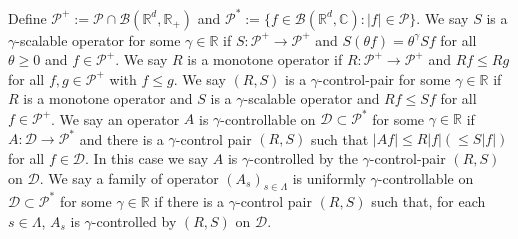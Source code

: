 \documentclass[12pt]{amsart}
\theoremstyle{plain}
\theoremstyle{definition}
\numberwithin{equation}{section}
\begin{document}
    Define $\mathcal P^+:= \mathcal P \cap \mathcal B(\mathbb R^d, \mathbb R_+)$ and $\mathcal P^*:= \{f\in \mathcal B(\mathbb R^d, \mathbb C): |f|\in \mathcal P\}$.
    We say $S$ is a $\gamma$-scalable operator for some $\gamma\in \mathbb R$ if $S: \mathcal P^+ \to \mathcal P^+$ and $S(\theta f) = \theta^\gamma Sf$ for all $\theta \geq 0$ and $f \in \mathcal P^+$.
    We say $R$ is a monotone operator if $R:\mathcal P^+ \to \mathcal P^+$ and $Rf \leq Rg$ for all $f, g \in \mathcal P^+$ with $f\leq g$.
    We say $(R,S)$ is a $\gamma$-control-pair for some $\gamma \in \mathbb R$ if $R$ is a monotone operator and $S$ is a $\gamma$-scalable operator and $Rf\leq Sf$ for all $f\in \mathcal P^+$.
    We say an operator $A$ is $\gamma$-controllable on $\mathcal D \subset \mathcal P^*$ for some $\gamma \in \mathbb R$ if $A: \mathcal D \to \mathcal P^*$ and there  is a $\gamma$-control pair $(R,S)$ such that $|Af|\leq R|f| (\le S|f|)$ for all $f\in \mathcal D$.
    In this case we say $A$ is $\gamma$-controlled by the $\gamma$-control-pair $(R,S)$ on $\mathcal D$.
    We say a family of operator $(A_s)_{s\in \Lambda}$ is uniformly $\gamma$-controllable on $\mathcal D\subset \mathcal P^*$ for some $\gamma \in \mathbb R$ if there is a $\gamma$-control pair $(R,S)$ such that, for each $s\in \Lambda$, $A_s$ is $\gamma$-controlled by $(R, S)$ on $\mathcal D$.
 
\end{document}
